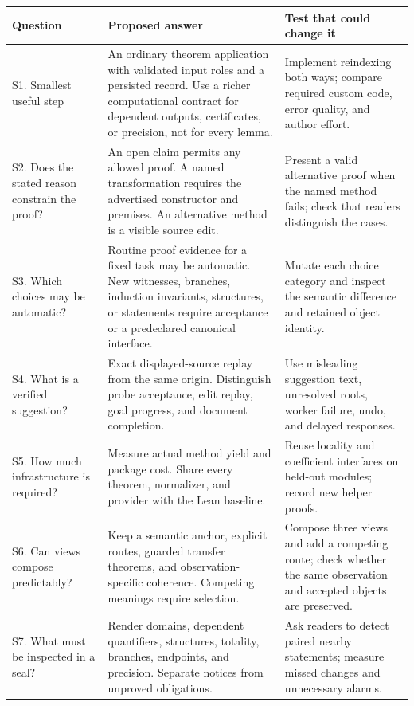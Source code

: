 \documentclass[11pt,letterpaper]{article}
\renewcommand{\arraystretch}{1.15}
\theoremstyle{definition}
\begin{document}
\begingroup\small\renewcommand{\arraystretch}{1.08}
\begin{longtable}{@{}P{.21\textwidth}P{.43\textwidth}P{.28\textwidth}@{}}
\toprule
Question & Proposed answer & Test that could change it \\
\midrule
\endhead
S1. Smallest useful step & An ordinary theorem application with validated input
roles and a persisted record. Use a richer computational contract for dependent
outputs, certificates, or precision, not for every lemma. & Implement reindexing
both ways; compare required custom code, error quality, and author effort.\\
S2. Does the stated reason constrain the proof? & An open claim permits any allowed
proof. A named transformation requires the advertised constructor and premises.
An alternative method is a visible source edit. & Present a valid alternative
proof when the named method fails; check that readers distinguish the cases.\\
S3. Which choices may be automatic? & Routine proof evidence for a fixed task may
be automatic. New witnesses, branches, induction invariants, structures, or
statements require acceptance or a predeclared canonical interface. & Mutate each
choice category and inspect the semantic difference and retained object identity.\\
S4. What is a verified suggestion? & Exact displayed-source replay from the same
origin. Distinguish probe acceptance, edit replay, goal progress, and document
completion. & Use misleading suggestion text, unresolved roots, worker failure,
undo, and delayed responses.\\
S5. How much infrastructure is required? & Measure actual method yield and package
cost. Share every theorem, normalizer, and provider with the Lean baseline. & Reuse
locality and coefficient interfaces on held-out modules; record new helper proofs.\\
S6. Can views compose predictably? & Keep a semantic anchor, explicit routes,
guarded transfer theorems, and observation-specific coherence. Competing meanings
require selection. & Compose three views and add a competing route; check whether
the same observation and accepted objects are preserved.\\
S7. What must be inspected in a seal? & Render domains, dependent quantifiers,
structures, totality, branches, endpoints, and precision. Separate notices from
unproved obligations. & Ask readers to detect paired nearby statements; measure
missed changes and unnecessary alarms.\\

\end{longtable}
\end{document}
